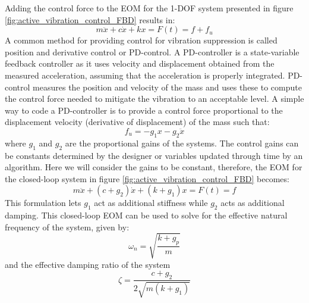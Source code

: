 \documentclass[12pt,letter]{article}
\numberwithin{ex}{section} %
\numberwithin{re}{section} %
\begin{document}
Adding the control force to the EOM for the 1-DOF system presented in figure \ref{fig:active_vibration_control_FBD} results in:
\begin{equation}
m \ddot{x} + c \dot{x} + kx = F(t) = f + f_u
\end{equation}
A common method for providing control for vibration suppression is called position and derivative control or PD-control. A PD-controller is a state-variable feedback controller as it uses velocity and displacement obtained from the measured acceleration, assuming that the acceleration is properly integrated. PD-control measures the position and velocity of the mass and uses these to compute the control force needed to mitigate the vibration to an acceptable level. A simple way to code a PD-controller is to provide a control force proportional to the displacement velocity (derivative of displacement) of the mass such that:
\begin{equation}
f_u = -g_1x - g_2 \ddot{x}
\end{equation}
where $g_1$ and $g_2$ are the proportional gains of the systems. The control gains can be constants determined by the designer or variables updated through time by an algorithm. Here we will consider the gains to be constant, therefore, the EOM for the closed-loop system in figure \ref{fig:active_vibration_control_FBD} becomes:
\begin{equation}
m \ddot{x} + (c + g_2) \dot{x} + (k + g_1)x = F(t) = f 
\end{equation}
This formulation lets $g_1$ act as additional stiffness while $g_2$ acts as additional damping. This closed-loop EOM can be used to solve for the effective natural frequency of the system, given by:
\begin{equation}
\omega_n = \sqrt{\frac{k+g_p}{m}}
\end{equation}
and the effective damping ratio of the system
\begin{equation}
\zeta = \frac{c+g_2}{2\sqrt{m(k+g_1)}}
\end{equation}



























			\noindent
			

	\pagebreak
	\renewcommand{\thepage}{}
	\renewcommand\refname{References Cited}
	\pagestyle{plain}
	
	
	
\end{document}
